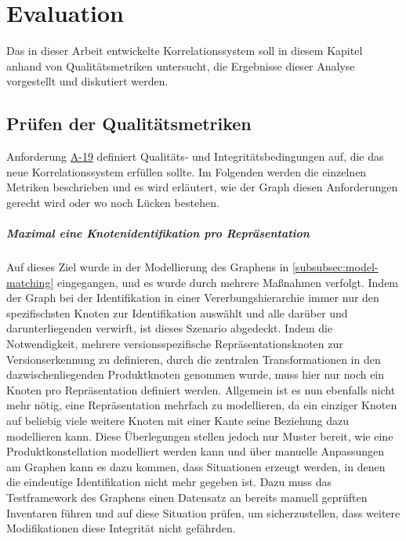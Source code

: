 \chapter{Evaluation}\label{ch:evaluation}

Das in dieser Arbeit entwickelte Korrelationssystem soll in diesem Kapitel anhand von Qualitätsmetriken untersucht, die Ergebnisse dieser Analyse vorgestellt und diskutiert werden.


\section{Prüfen der Qualitätsmetriken}

Anforderung \hyperref[subsec:req-graph-inner-consistency]{A-19} definiert Qualitäts‑ und Integritätsbedingungen auf, die das neue Korrelationssystem erfüllen sollte.
Im Folgenden werden die einzelnen Metriken beschrieben und es wird erläutert, wie der Graph diesen Anforderungen gerecht wird oder wo noch Lücken bestehen.

\paragraph{Maximal eine Knotenidentifikation pro Repräsentation}
Auf dieses Ziel wurde in der Modellierung des Graphens in \autoref{subsubsec:model-matching} eingegangen, und es wurde durch mehrere Maßnahmen verfolgt.
Indem der Graph bei der Identifikation in einer Vererbungshierarchie immer nur den spezifischsten Knoten zur Identifikation auswählt und alle darüber und darunterliegenden verwirft, ist dieses Szenario abgedeckt.
Indem die Notwendigkeit, mehrere versionsspezifische Repräsentationsknoten zur Versionserkennung zu definieren, durch die zentralen Transformationen in den dazwischenliegenden Produktknoten genommen wurde, muss hier nur noch ein Knoten pro Repräsentation definiert werden.
Allgemein ist es nun ebenfalls nicht mehr nötig, eine Repräsentation mehrfach zu modellieren, da ein einziger Knoten auf beliebig viele weitere Knoten mit einer Kante seine Beziehung dazu modellieren kann.
Diese Überlegungen stellen jedoch nur Muster bereit, wie eine Produktkonstellation modelliert werden kann und über manuelle Anpassungen am Graphen kann es dazu kommen, dass Situationen erzeugt werden, in denen die eindeutige Identifikation nicht mehr gegeben ist.
Dazu muss das Testframework des Graphens einen Datensatz an bereits manuell geprüften Inventaren führen und auf diese Situation prüfen, um sicherzustellen, dass weitere Modifikationen diese Integrität nicht gefährden.

